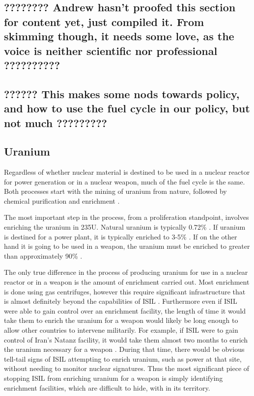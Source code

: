 \documentclass{report}
\begin{document}
\subsection{???????? Andrew hasn't proofed this section for content yet, just compiled it. From skimming though, it needs some love, as the voice is neither scientific nor professional     ??????????}


\subsection{??????  This makes some nods towards policy, and how to use the fuel cycle in our policy, but not much  ?????????}


\subsection{Uranium}

Regardless of whether nuclear material is destined to be used in a nuclear reactor for power generation or in a nuclear weapon, much of the fuel cycle is the same. Both processes start with the mining of uranium from nature, followed by chemical purification and enrichment \cite{Moody2014}.

The most important step in the process, from a proliferation standpoint, involves enriching the uranium in 235U. Natural uranium is typically 0.72\%  \cite{Benedict1981}.  If uranium is destined for a power plant, it is typically enriched to 3-5\% . If on the other hand it is going to be used in a weapon, the uranium must be enriched to greater than approximately 90\%  \cite{Moody2014}. 

The only true difference in the process of producing uranium for use in a nuclear reactor or in a weapon is the amount of enrichment carried out. Most enrichment is done using gas centrifuges, however this require significant infrastructure that is almost definitely beyond the capabilities of ISIL \cite{Benedict1981}.  Furthermore even if ISIL were able to gain control over an enrichment facility, the length of time it would take them to enrich the uranium for a weapon would likely be long enough to allow other countries to intervene militarily. For example, if ISIL were to gain control of Iran's Natanz facility, it would take them almost two months to enrich the uranium necessary for a weapon \cite{WisconsinProjectonNuclearArmsControl2015}. During that time, there would be obvious tell-tail signs of ISIL attempting to enrich uranium, such as power at that site, without needing to monitor nuclear signatures. Thus the most significant piece of stopping ISIL from enriching uranium for a weapon is simply identifying enrichment facilities, which are difficult to hide, with in its territory. 
\end{document}
